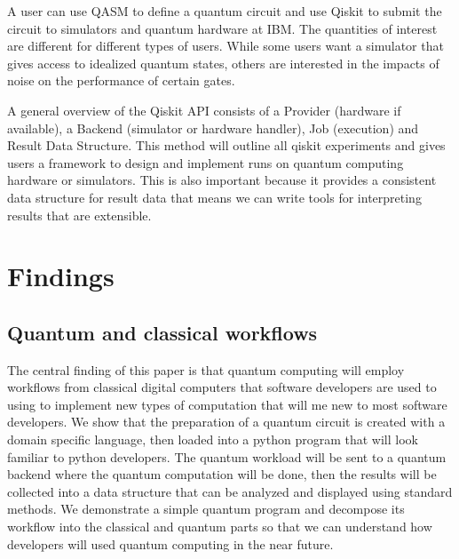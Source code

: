 \documentclass[conference]{IEEEtran}
\begin{document}
A user can use QASM to define a quantum circuit and use Qiskit to submit the circuit to simulators and quantum hardware at IBM. The quantities of interest are different for different types of users. While some users want a simulator that gives access to idealized quantum states, others are interested in the impacts of noise on the performance of certain gates.

A general overview of the Qiskit API consists of a Provider (hardware if available), a Backend (simulator or hardware handler), Job (execution) and Result Data Structure. This method will outline all qiskit experiments and gives users a framework to design and implement runs on quantum computing hardware or simulators. This is also important because it provides a consistent data structure for result data that means we can write tools for interpreting results that are extensible.

\section{Findings}

\subsection{Quantum and classical workflows}

The central finding of this paper is that quantum computing will employ workflows from classical digital computers that software developers are used to using to implement new types of computation that will me new to most software developers. We show that the preparation of a quantum circuit is created with a domain specific language, then loaded into a python program that will look familiar to python developers. The quantum workload will be sent to a quantum backend where the quantum computation will be done, then the results will be collected into a data structure that can be analyzed and displayed using standard methods. We demonstrate a simple quantum program and decompose its workflow into the classical and quantum parts so that we can understand how developers will used quantum computing in the near future.
\end{document}
